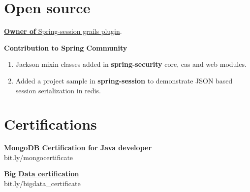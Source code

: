 \documentclass[]{resume}
\begin{document}
\begin{minipage}[t]{0.66\textwidth}

        \section{Open source}\label{sec:open-source}
        \vspace{\topsep}
        \begin{tightemize}
            \item \href{https://plugins.grails.org/plugin/jeetmp3/spring-session}{\textbf{Owner of} Spring-session grails plugin}.
            \item \textbf{Contribution to Spring Community}
                \begin{enumerate}
                    \item \small Jackson mixin classes added in \textbf{spring-security} core, cas and web modules.
                    \item Added a project sample in \textbf{spring-session} to demonstrate JSON based session
                    serialization in redis.
                \end{enumerate}
        \end{tightemize}
        \sectionsep

        \section{Certifications}\label{sec:certifications}
        \vspace{\topsep}
        \begin{tightemize}
            \item \href{https://drive.google.com/file/d/0B3T07LM4mDj8SnFiOGl4LTZsaVk/view}{\textbf{MongoDB Certification for Java developer}}\\
            bit.ly/mongocertificate
            {\vspace{\topsep}}
            \item \href{https://www.edureka.co/my-certificate/eadaa90dfc3b7655d95d57f5413043f6}{\textbf{Big Data certification}}\\
            bit.ly/bigdata\_certificate
        \end{tightemize}
        \sectionsep



\end{minipage}
\end{document}
